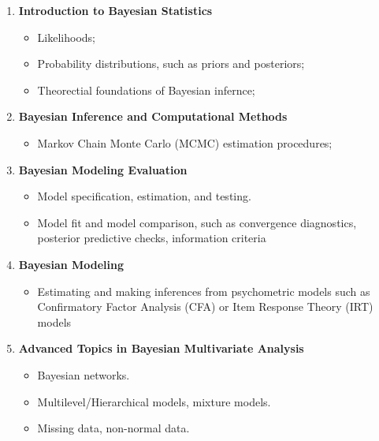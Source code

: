 \documentclass[
  letterpaper,
  DIV=11,
  numbers=noendperiod]{scrartcl}
\providecommand{\tightlist}{%
  \setlength{\itemsep}{0pt}\setlength{\parskip}{0pt}}\usepackage{longtable,booktabs,array}
\begin{document}
\begin{enumerate}
\def\labelenumi{\arabic{enumi}.}
\tightlist
\item
  \textbf{Introduction to Bayesian Statistics}

  \begin{itemize}
  \tightlist
  \item
    Likelihoods;
  \item
    Probability distributions, such as priors and posteriors;
  \item
    Theorectial foundations of Bayesian infernce;
  \end{itemize}
\item
  \textbf{Bayesian Inference and Computational Methods}

  \begin{itemize}
  \tightlist
  \item
    Markov Chain Monte Carlo (MCMC) estimation procedures;
  \end{itemize}
\item
  \textbf{Bayesian Modeling Evaluation}

  \begin{itemize}
  \tightlist
  \item
    Model specification, estimation, and testing.
  \item
    Model fit and model comparison, such as convergence diagnostics,
    posterior predictive checks, information criteria
  \end{itemize}
\item
  \textbf{Bayesian Modeling}

  \begin{itemize}
  \tightlist
  \item
    Estimating and making inferences from psychometric models such as
    Confirmatory Factor Analysis (CFA) or Item Response Theory (IRT)
    models
  \end{itemize}
\item
  \textbf{Advanced Topics in Bayesian Multivariate Analysis}

  \begin{itemize}
  \tightlist
  \item
    Bayesian networks.
  \item
    Multilevel/Hierarchical models, mixture models.
  \item
    Missing data, non-normal data.
  \end{itemize}
\end{enumerate}
\end{document}
